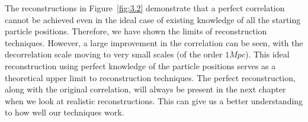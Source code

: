 The reconstructions in Figure~\ref{fig:3.2} demonstrate that a perfect correlation cannot be achieved even in the ideal case of existing knowledge of all the starting particle positions. Therefore, we have shown the limits of reconstruction techniques. However, a large improvement in the correlation can be seen, with the decorrelation scale moving to very small scales (of the order $1 Mpc$). This ideal reconstruction using perfect knowledge of the particle positions serves as a theoretical upper limit to reconstruction techniques. The perfect reconstruction, along with the original correlation, will always be present in the next chapter when we look at realistic reconstructions. This can give us a better understanding to how well our techniques work.


    
    
